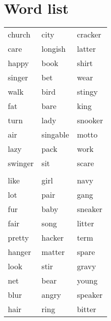 \chapter{Word list}
\label{app.list}
\renewcommand{\arraystretch}{1.5}
\setlength{\tabcolsep}{30pt}

\begin{tabular}{lll}
church & city & cracker \\ 
care & longish & latter \\ 
happy & book & shirt \\ 
singer & bet & wear \\ 
walk & bird & stingy \\ 
fat & bare & king \\ 
turn & lady & snooker \\ 
air & singable & motto \\ 
lazy & pack & work \\ 
swinger & sit & scare \\ 
 &  &  \\ 
like & girl & navy \\ 
lot & pair & gang \\ 
fur & baby & sneaker \\ 
fair & song & litter \\ 
pretty & hacker & term \\ 
hanger & matter & spare \\ 
look & stir & gravy \\ 
net & bear & young \\ 
blur & angry & speaker \\ 
hair & ring & bitter \\ 
\end{tabular}